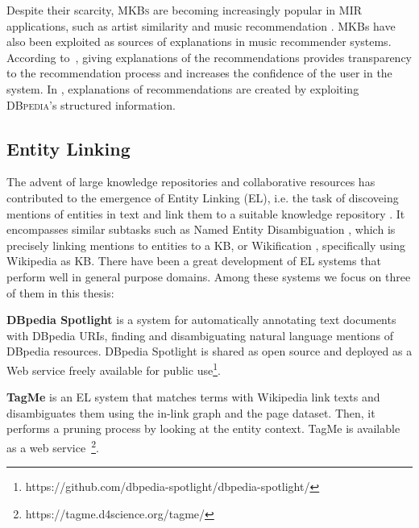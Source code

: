 Despite their scarcity, \textsc{MKBs} are becoming increasingly popular in MIR applications, such as artist similarity and music recommendation \citep{Celma2008,Leal2012,Ostuni2013}.
MKBs have also been exploited as sources of explanations in music recommender systems. According to~\citep{CelmaandHerrera2008}, giving explanations of the recommendations provides transparency to the recommendation process and increases the confidence of the user in the system. In \citep{Passant2010}, explanations of recommendations are created by exploiting \textsc{DBpedia}'s structured information.%


\subsection{Entity Linking}
\label{sec:SOA:nlu:entity_linking}


The advent of large knowledge repositories and collaborative resources has contributed to the emergence of Entity Linking (EL), i.e. the task of discoveing mentions of entities in text and link them to a suitable knowledge repository \citep{Moroetal2014}. 
It encompasses similar subtasks such as Named Entity Disambiguation \citep{BunescuandPasca2006}, which is precisely linking mentions to entities to a KB, or Wikification \citep{MihalceaandCsomai2007}, specifically using Wikipedia as KB.
There have been a great development of EL systems that perform well in general purpose domains. Among these systems we focus on three of them in this thesis:

\noindent \textbf{DBpedia Spotlight} \citep{Mendes2011} is a system for automatically annotating text documents with DBpedia URIs, finding and disambiguating natural language mentions of DBpedia resources. DBpedia Spotlight is shared as open source and deployed as a Web service freely available for public use\footnote{https://github.com/dbpedia-spotlight/dbpedia-spotlight/}.

\vspace{-0.2cm}
\noindent \textbf{TagMe} \citep{Ferragina2012} is an EL system that matches terms with Wikipedia link texts and disambiguates them using the in-link graph and the page dataset. Then, it performs a pruning process by looking at the entity context. TagMe is available as a web service~\footnote{https://tagme.d4science.org/tagme/}.

